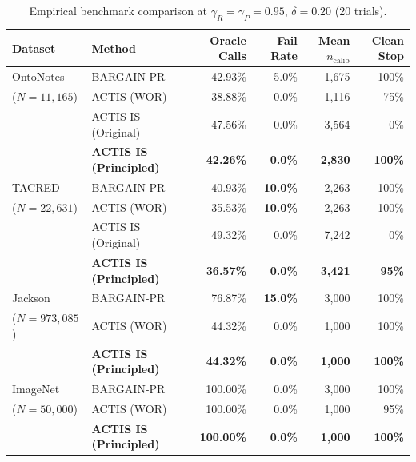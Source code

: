\documentclass[11pt,a4paper]{article}
\begin{document}
\begin{table}[ht]
\centering
\small
\setlength{\tabcolsep}{5pt}
\caption{Empirical benchmark comparison at $\gamma_R = \gamma_P = 0.95$, $\delta = 0.20$ (20 trials).}\label{tab:results_delta_20}
\begin{tabular*}{\textwidth}{@{\extracolsep{\fill}}llrrrr}
\toprule
Dataset & Method & Oracle Calls & Fail Rate & Mean $n_{\text{calib}}$ & Clean Stop \\
\midrule
OntoNotes & BARGAIN-PR & 42.93\% & 5.0\% & 1,675 & 100\% \\
($N=11,165$) & ACTIS (WOR) & 38.88\% & 0.0\% & 1,116 & 75\% \\
 & ACTIS IS (Original) & 47.56\% & 0.0\% & 3,564 & 0\% \\
 & \textbf{ACTIS IS (Principled)} & \textbf{42.26\%} & \textbf{0.0\%} & \textbf{2,830} & \textbf{100\%} \\
\midrule
TACRED & BARGAIN-PR & 40.93\% & \textbf{10.0\%} & 2,263 & 100\% \\
($N=22,631$) & ACTIS (WOR) & 35.53\% & \textbf{10.0\%} & 2,263 & 100\% \\
 & ACTIS IS (Original) & 49.32\% & 0.0\% & 7,242 & 0\% \\
 & \textbf{ACTIS IS (Principled)} & \textbf{36.57\%} & \textbf{0.0\%} & \textbf{3,421} & \textbf{95\%} \\
\midrule
Jackson & BARGAIN-PR & 76.87\% & \textbf{15.0\%} & 3,000 & 100\% \\
($N=973,085$) & ACTIS (WOR) & 44.32\% & 0.0\% & 1,000 & 100\% \\
 & \textbf{ACTIS IS (Principled)} & \textbf{44.32\%} & \textbf{0.0\%} & \textbf{1,000} & \textbf{100\%} \\
\midrule
ImageNet & BARGAIN-PR & 100.00\% & 0.0\% & 3,000 & 100\% \\
($N=50,000$) & ACTIS (WOR) & 100.00\% & 0.0\% & 1,000 & 95\% \\
 & \textbf{ACTIS IS (Principled)} & \textbf{100.00\%} & \textbf{0.0\%} & \textbf{1,000} & \textbf{100\%} \\
\bottomrule
\end{tabular*}
\end{table}
\end{document}
